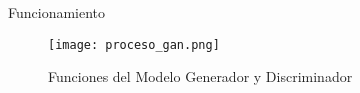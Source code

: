 \begin{frame}{Funcionamiento}
   \begin{figure}[H]
      \begin{center}
        \texttt{[image: proceso\_gan.png]}
        \caption{Funciones del Modelo Generador y Discriminador}
        \label{Alexis2}
      \end{center}
   \end{figure}
   
\end{frame}